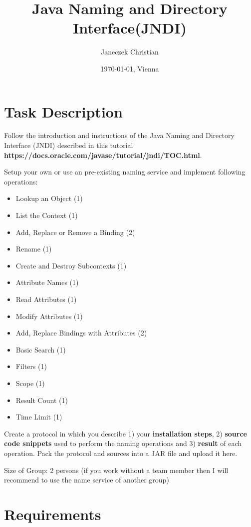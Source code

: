 \documentclass[11pt,a4paper]{article}
\title{Java Naming and Directory Interface(JNDI)}
\author{Janeczek Christian}
\date{\today{}, Vienna}
\begin{document}
\maketitle
\newpage
\tableofcontents
\newpage

\section{Task Description}
Follow the introduction and instructions of the Java Naming and Directory Interface (JNDI) described in this tutorial \textbf{https://docs.oracle.com/javase/tutorial/jndi/TOC.html}. \newline

\noindent Setup your own or use an pre-existing naming service and implement following operations:
\begin{itemize}
	\item Lookup an Object (1)
	\item List the Context (1)
	\item Add, Replace or Remove a Binding (2)
	\item Rename (1)
	\item Create and Destroy Subcontexts (1)
	\item Attribute Names (1)
	\item Read Attributes (1)
	\item Modify Attributes (1)
	\item Add, Replace Bindings with Attributes (2)
	\item Basic Search (1)
	\item Filters (1)
	\item Scope (1)
	\item Result Count (1)
	\item Time Limit (1)
\end{itemize}
 
\noindent Create a protocol in which you describe 1) your \textbf{installation steps}, 2) \textbf{source code snippets} used to perform the naming operations and 3) \textbf{result} of each operation. Pack the protocol and sources into a JAR file and upload it here. \newline

\noindent Size of Group: 2 persons
(if you work without a team member then I will recommend to use the name service of another group)
\newpage

\section{Requirements}
\end{document}
